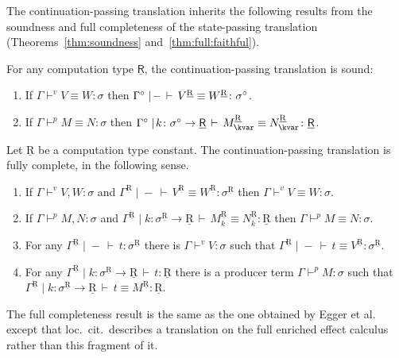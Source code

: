 \documentclass{LMCS}
\newcommand{\vj}[3]{#1 \mathrel{\vdash^{v}} #2 \colon \! #3}
\newcommand{\pj}[3]{#1 \mathrel{\vdash^p} #2 \colon \! #3}
\newcommand{\veq}[4]{#1 \mathrel{\vdash^{v}} #2\equiv #3 \colon \! #4}
\newcommand{\peq}[4]{#1 \mathrel{\vdash^p} #2\equiv #3 \colon \! #4}
\newcommand{\STA}{\sigma}
\newcommand{\EECarbret}{\comptype{\mathsf{R}}}
\newcommand{\EECret}{\comptype{\mathrm{R}}}
\newcommand{\kvar}k
\newcommand{\comptype}[1]{\underline{#1}}
\newcommand{\co}{\colon}
\newcommand{\lpowertype}[2]{#1\to #2}
\newcommand{\rIn}[2]{#1 \colon  #2}
\newcommand{\aj}[4]{#1 \mid  \! #2 \, \vdash \, \rIn{#3}{#4}}
\newcommand{\aeq}[5]{#1 \mid  \! #2 \, \vdash \, \rIn{#3\equiv #4}{#5}}
\newcommand{\tj}[3]{\aj{#1}{{-}}{#2}{#3}}
\newcommand{\teq}[4]{\aj{#1}{{-}}{#2\equiv #3}{#4}}
\newcommand{\CBVtoEEC}[1]{#1^{\circ}}
\newcommand{\CBVtoEECbase}[2]{#2^{#1}}
\begin{document}
The continuation-passing translation inherits the following results from the 
soundness and full completeness of the state-passing translation 
(Theorems~\ref{thm:soundness} and~\ref{thm:full:faithful}). 
\begin{prop}
For any computation type $\EECarbret$,
the continuation-passing translation is sound: 
\begin{enumerate}
\item
If $\veq\Gamma VW\sigma$ then 
$\teq{\CBVtoEEC \Gamma}{\CBVtoEECV{V}}{\CBVtoEECV{W}}{\CBVtoEEC \sigma}$.
\item 
If $\peq\Gamma MN\sigma$ then 
$\aeq{\CBVtoEEC \Gamma}{\kvar\co \lpowertype{\CBVtoEEC\sigma}\EECarbret}
{\CBVtoEECP{M}}{\CBVtoEECP{N}}{\EECarbret}$.
\end{enumerate}
\end{prop}
\renewcommand{\lneg}[1]{\lpowertype {#1}\EECret}\renewcommand{\CBVtoEEC}{\CBVtoEECbase\EECret}\renewcommand{\CBVtoEECV}{\CBVtoEECbase \EECret}\renewcommand{\CBVtoEECP}[1]{\CBVtoEECbase \EECret{#1}_\kvar}\begin{prop}
Let $\EECret$ be a computation type constant.
The continuation-passing translation is fully complete, in the following 
sense.
\begin{enumerate}
\item \label{item:cps:faithful:values} 
If 
$\vj{\Gamma}{V,W}{\STA}$ 
and 
$\teq{\CBVtoEEC\Gamma}{\CBVtoEECV{V}}{\CBVtoEECV{W}}{\CBVtoEEC\STA}$ 
then $\veq \Gamma V W\STA$.
\item 
If  
$\pj{\Gamma}{M,N}{\STA}$
and 
$\aeq{\CBVtoEEC\Gamma}{\kvar\co \lneg {\CBVtoEEC\STA}}{\CBVtoEECP{M}}{\CBVtoEECP{N}}{\EECret}$ then 
$\peq{\Gamma}MN{\STA}$.
\item For any $\tj{\CBVtoEEC{\Gamma}}{t}{\CBVtoEEC{\STA}}$ there is  $\vj{\Gamma}{V}{\STA}$ such that $\teq{\CBVtoEEC\Gamma}t{ \CBVtoEEC{V}}{\CBVtoEEC\STA}$. 
\item For any $\aj{\CBVtoEEC{\Gamma}}{\kvar \co \lneg{\CBVtoEEC\STA}}{t}{\EECret}$ there is a producer term $\pj{\Gamma}{M}{\STA}$ such that 
$\aeq{\CBVtoEEC\Gamma}{\kvar \co \lneg{\CBVtoEEC\STA}}{t} {\CBVtoEEC{M}}{\EECret}$.
\end{enumerate}
\end{prop}

\noindent The full completeness result is the same as 
the one obtained by Egger 
et al.~\cite[Corollary~1]{Mogelberg:fossacs:10} 
except that loc.~cit.~describes a translation on the full enriched
effect calculus rather than this fragment of it.
\end{document}
